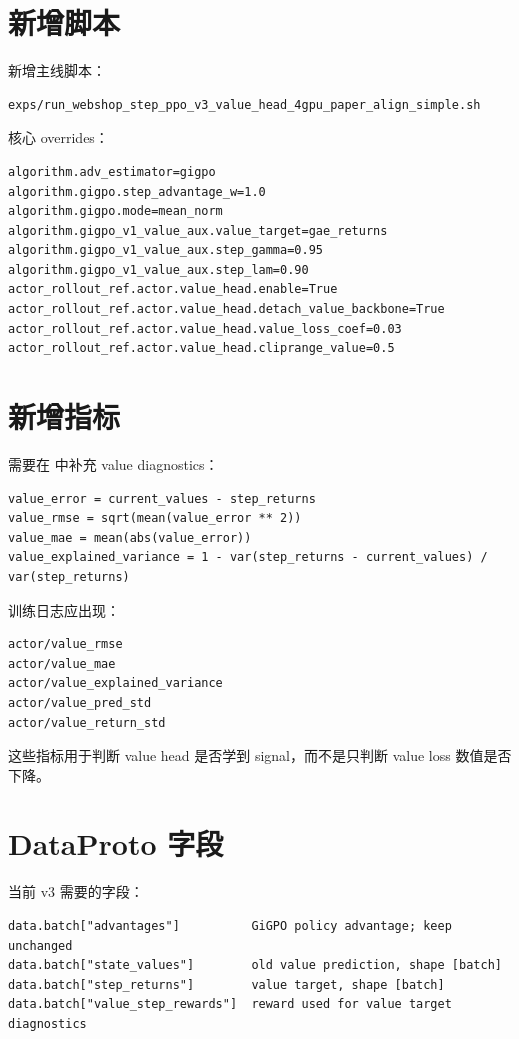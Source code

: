 \documentclass[10pt]{ctexart}
\begin{document}
\section*{新增脚本}
新增主线脚本：
\begin{lstlisting}
exps/run_webshop_step_ppo_v3_value_head_4gpu_paper_align_simple.sh
\end{lstlisting}

核心 overrides：
\begin{lstlisting}
algorithm.adv_estimator=gigpo
algorithm.gigpo.step_advantage_w=1.0
algorithm.gigpo.mode=mean_norm
algorithm.gigpo_v1_value_aux.value_target=gae_returns
algorithm.gigpo_v1_value_aux.step_gamma=0.95
algorithm.gigpo_v1_value_aux.step_lam=0.90
actor_rollout_ref.actor.value_head.enable=True
actor_rollout_ref.actor.value_head.detach_value_backbone=True
actor_rollout_ref.actor.value_head.value_loss_coef=0.03
actor_rollout_ref.actor.value_head.cliprange_value=0.5
\end{lstlisting}

\section*{新增指标}
需要在  中补充 value diagnostics：
\begin{lstlisting}
value_error = current_values - step_returns
value_rmse = sqrt(mean(value_error ** 2))
value_mae = mean(abs(value_error))
value_explained_variance = 1 - var(step_returns - current_values) / var(step_returns)
\end{lstlisting}

训练日志应出现：
\begin{lstlisting}
actor/value_rmse
actor/value_mae
actor/value_explained_variance
actor/value_pred_std
actor/value_return_std
\end{lstlisting}

这些指标用于判断 value head 是否学到 signal，而不是只判断 value loss 数值是否下降。

\section*{DataProto 字段}
当前 v3 需要的字段：
\begin{lstlisting}
data.batch["advantages"]          GiGPO policy advantage; keep unchanged
data.batch["state_values"]        old value prediction, shape [batch]
data.batch["step_returns"]        value target, shape [batch]
data.batch["value_step_rewards"]  reward used for value target diagnostics
\end{lstlisting}
\end{document}
